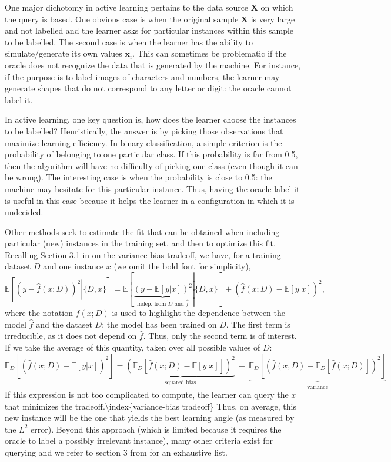 One major dichotomy in active learning pertains to the data source $\textbf{X}$ on which the query is based. One obvious case is when the original sample $\textbf{X}$ is very large and not labelled and the learner asks for particular instances within this sample to be labelled. The second case is when the learner has the ability to simulate/generate its own values $\textbf{x}_i$. This can sometimes be problematic if the oracle does not recognize the data that is generated by the machine. For instance, if the purpose is to label images of characters and numbers, the learner may generate shapes that do not correspond to any letter or digit: the oracle cannot label it.

In active learning, one key question is, how does the learner choose the instances to be labelled? Heuristically, the answer is by picking those observations that maximize learning efficiency. In binary classification, a simple criterion is the probability of belonging to one particular class. If this probability is far from 0.5, then the algorithm will have no difficulty of picking one class (even though it can be wrong). The interesting case is when the probability is close to 0.5: the machine may hesitate for this particular instance. Thus, having the oracle label it is useful in this case because it helps the learner in a configuration in which it is undecided.

Other methods seek to estimate the fit that can be obtained when including particular (new) instances in the training set, and then to optimize this fit. Recalling Section 3.1 in \cite{geman1992neural} on the variance-bias tradeoff, we have, for a training dataset $D$ and one instance $x$ (we omit the bold font for simplicity),
\begin{equation}
\mathbb{E}\left[\left.(y-\hat{f}(x;D))^2\right|\{D,x\}\right]=\mathbb{E}\left[\left.\underbrace{(y-\mathbb{E}[y|x])^2}_{\text{indep. from }D\text{ and }\hat{f}} \right|\{D,x\} \right]+(\hat{f}(x;D)-\mathbb{E}[y|x])^2,
\end{equation}
where the notation $f(x;D)$ is used to highlight the dependence between the model $\hat{f}$ and the dataset $D$: the model has been trained on $D$. The first term is irreducible, as it does not depend on $\hat{f}$. Thus, only the second term is of interest. If we take the average of this quantity, taken over all possible values of $D$:
\begin{equation}
\mathbb{E}_D\left[(\hat{f}(x;D)-\mathbb{E}[y|x])^2  \right]=\underbrace{\left(\mathbb{E}_D\left[\hat{f}(x;D)-\mathbb{E}[y|x]\right]\right)^2}_{\text{squared bias}} \ + \ \underbrace{\mathbb{E}_D\left[(\hat{f}(x,D)-\mathbb{E}_D[\hat{f}(x;D)])^2\right]}_{\text{variance}}
\end{equation}
If this expression is not too complicated to compute, the learner can query the $x$ that minimizes the tradeoff.{\textbackslash}index\{variance-bias tradeoff\} Thus, on average, this new instance will be the one that yields the best learning angle (as measured by the $L^2$ error). Beyond this approach (which is limited because it requires the oracle to label a possibly irrelevant instance), many other criteria exist for querying and we refer to section 3 from \cite{settles2009active} for an exhaustive list.

